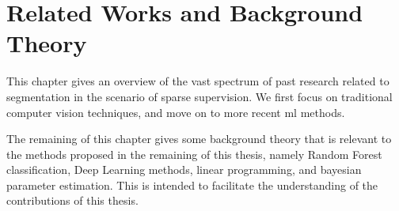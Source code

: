 \chapter{Related Works and Background Theory}
\glsresetall

\renewcommand{\thealgsubstate}{\alph{algsubstate}}
\newenvironment{algsubstates}
  {\setcounter{algsubstate}{0}%
   \renewcommand{\State}{%
     \stepcounter{algsubstate}%
     \Statex {\footnotesize\thealgsubstate:}\space}}
  {}

This chapter gives an overview of the vast spectrum of past research related to segmentation in the scenario of sparse supervision.
We first focus on traditional computer vision techniques, and
move on to more recent \gls{ml} methods.

The remaining of this chapter gives some background theory that is relevant to the methods proposed in the remaining of this thesis, namely Random Forest classification, Deep Learning methods, linear programming, and bayesian parameter estimation.
This is intended to facilitate the understanding of the contributions of this thesis.





